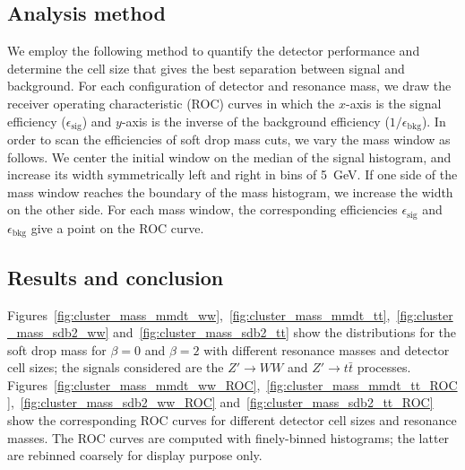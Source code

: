 \subsection{Analysis method \label{sec:massana}}
We employ the following method to quantify the detector performance and 
determine the cell size that gives the best separation between  
signal and background. For each configuration of detector and resonance mass, 
we draw the receiver operating characteristic (ROC) curves in which the $x$-axis
 is the signal efficiency ($\epsilon_\mathrm{sig}$) and $y$-axis is the inverse 
of the background efficiency ($1/\epsilon_\mathrm{bkg}$). 
In order to scan the efficiencies of soft drop mass cuts, we vary the mass 
window as follows. We center the initial window on the median of the signal histogram, and increase its width symmetrically left and right in bins of 5~GeV. 
If one side of the mass window reaches the boundary 
of the mass histogram, we increase the width on the other side. For each mass window, the corresponding efficiencies 
$\epsilon_\mathrm{sig}$ and $\epsilon_\mathrm{bkg}$ give a point on 
the ROC curve.

\subsection{Results and conclusion}\label{Rebin_section}

Figures~\ref{fig:cluster_mass_mmdt_ww},~\ref{fig:cluster_mass_mmdt_tt},~\ref{fig:cluster_mass_sdb2_ww} and~\ref{fig:cluster_mass_sdb2_tt} 
show the distributions for the soft drop mass for $\beta=0$ and $\beta=2$ with  
different resonance masses and detector cell sizes; the signals considered are 
the $Z'\rightarrow WW$ and $Z'\rightarrow t\bar{t}$ processes. 
Figures~\ref{fig:cluster_mass_mmdt_ww_ROC},~\ref{fig:cluster_mass_mmdt_tt_ROC},~\ref{fig:cluster_mass_sdb2_ww_ROC} and~\ref{fig:cluster_mass_sdb2_tt_ROC} 
show the corresponding ROC curves for different detector cell sizes and resonance masses.
The ROC curves are computed with finely-binned histograms; the latter are rebinned coarsely for display purpose only.

